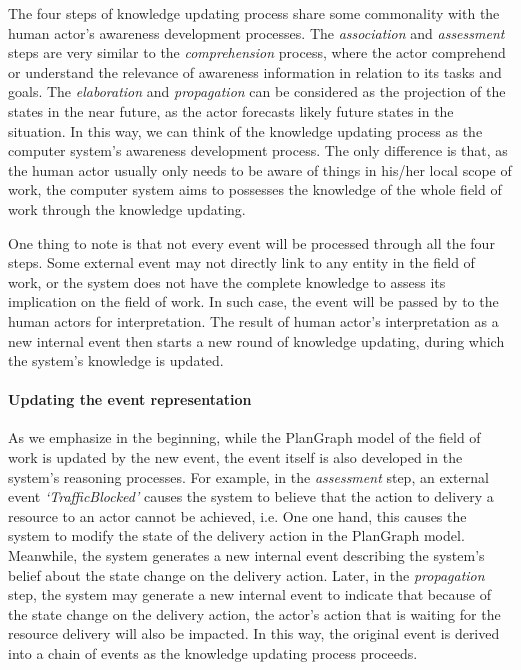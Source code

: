The four steps of knowledge updating process share some commonality with the human actor's awareness development processes. The \emph{association} and \emph{assessment} steps are very similar to the \emph{comprehension} process, where the actor comprehend or understand the relevance of awareness information in relation to its tasks and goals. The \emph{elaboration} and \emph{propagation} can be considered as the projection of the states in the near future, as the actor forecasts likely future states in the situation. In this way, we can think of the knowledge updating process as the computer system's awareness development process. The only difference is that, as the human actor usually only needs to be aware of things in his/her local scope of work, the computer system aims to possesses the knowledge of the whole field of work through the knowledge updating.

One thing to note is that not every event will be processed through all the four steps. Some external event may not directly link to any entity in the field of work, or the system does not have the complete knowledge to assess its implication on the field of work. In such case, the event will be passed by to the human actors for interpretation. The result of human actor's interpretation as a new internal event then starts a new round of knowledge updating, during which the system's knowledge is updated.

\paragraph*{Updating the event representation} %
\label{par:updating_the_event_representation}
As we emphasize in the beginning, while the PlanGraph model of the field of work is updated by the new event, the event itself is also developed in the system's reasoning processes. For example, in the \emph{assessment} step, an external event \emph{`TrafficBlocked'} causes the system to believe that the action to delivery a resource to an actor cannot be achieved, i.e. One one hand, this causes the system to modify the state of the delivery action in the PlanGraph model. Meanwhile, the system generates a new internal event describing the system's belief about the state change on the delivery action. Later, in the \emph{propagation} step, the system may generate a new internal event to indicate that because of the state change on the delivery action, the actor's action that is waiting for the resource delivery will also be impacted. In this way, the original event is derived into a chain of events as the knowledge updating process proceeds.

